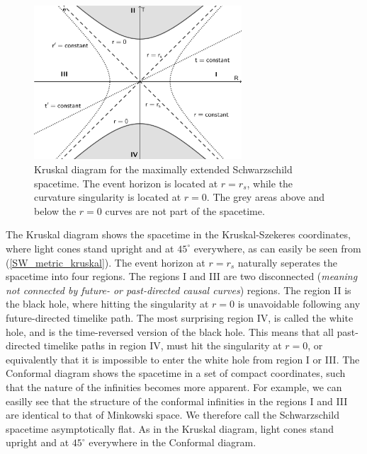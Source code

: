 \begin{figure}[h!]
%
\centering
%
\includegraphics[width=0.69\textwidth]{../pics/Kruskal_Schwarz.png}
%
\caption{Kruskal diagram for the maximally extended Schwarzschild spacetime. The event horizon is located at $r=r_s$, while the curvature singularity is located at $r=0$. The grey areas above and below the $r = 0$ curves are not part of the spacetime.}
%
\label{fig:Kruskal_SW}
%
\end{figure}
%
\newline \noindent
The Kruskal diagram shows the spacetime in the Kruskal-Szekeres coordinates, where light cones stand upright and at $45^{\circ}$ everywhere, as can easily be seen from (\ref{SW_metric_kruskal}). The event horizon at $r = r_s$ naturally seperates the spacetime into four regions. The regions I and III are two disconnected (\textit{meaning not connected by future- or past-directed causal curves}) regions. The region II is the black hole, where hitting the singularity at $r = 0$ is unavoidable following any future-directed timelike path. The most surprising region IV, is called the white hole, and is the time-reversed version of the black hole. This means that all past-directed timelike paths in region IV, must hit the singularity at $r = 0$, or equivalently that it is impossible to enter the white hole from region I or III.\newline \newline
%
%
The Conformal diagram shows the spacetime in a set of compact coordinates, such that the nature of the infinities becomes more apparent. For example, we can easilly see that the structure of the conformal infinities in the regions I and III are identical to that of Minkowski space. We therefore call the Schwarzschild spacetime asymptotically flat. As in the Kruskal diagram, light cones stand upright and at $45^{\circ}$ everywhere in the Conformal diagram.
%
%
